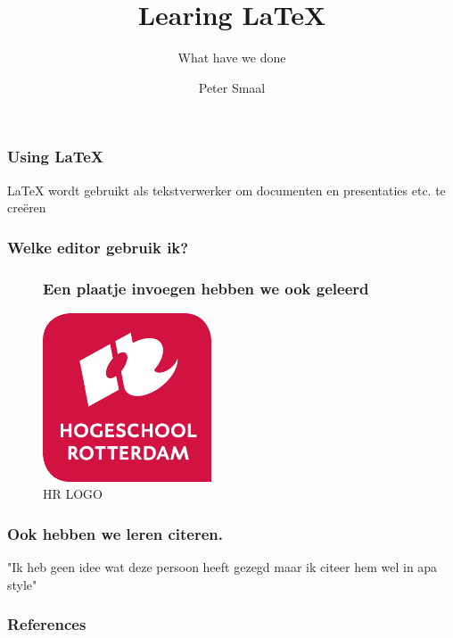 \documentclass{beamer}
\author{Peter Smaal}
\title{Learing \LaTeX}
\subtitle{What have we done}
\begin{document}
\newcommand*{\myfont}{\fontfamily{pcr}\selectfont}

\frame{\titlepage}


\begin{frame}
\frametitle{Using LaTeX}
LaTeX wordt gebruikt als tekstverwerker om documenten en presentaties etc. te creëren

\end{frame}

\begin{frame}
\frametitle{Welke editor gebruik ik?}
\myfont{Ik gebruik de editor "Texmaker". (Ik gebruik hier ook een andere font )}
\end{frame}

\begin{frame}
\begin{figure}
\frametitle{Een plaatje invoegen hebben we ook geleerd}
\includegraphics[width = 50mm]{Hogeschool-Rotterdam-Logo.pdf}
\caption{HR LOGO}
\label{fig: Hogeschool Rotterdam Logo}
\end{figure}
\end{frame}

\begin{frame}
\frametitle{Ook hebben we leren citeren.}
"Ik heb geen idee wat deze persoon heeft gezegd maar ik citeer hem wel in apa style"\cite{braams:babel}

\end{frame}

\begin{frame}
\frametitle{References}


\end{frame}
\end{document}
